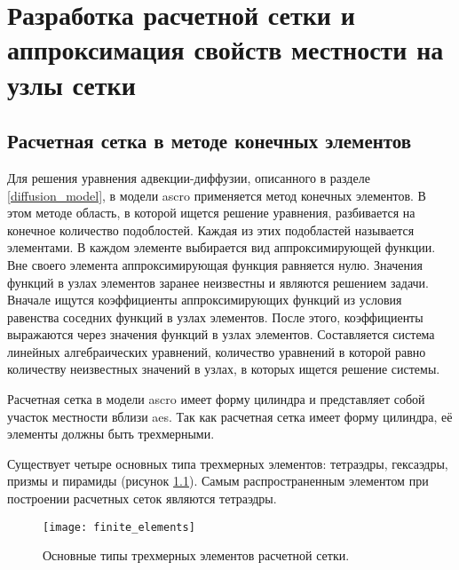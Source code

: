 \chapter{Разработка расчетной сетки и аппроксимация свойств местности на узлы сетки}


\section{Расчетная сетка в методе конечных элементов}
\label{sec_fin_elem_mesh}

Для решения уравнения адвекции-диффузии, описанного в разделе \ref{diffusion_model}, в модели \ac{ascro} применяется 
метод конечных элементов. В этом методе область, в которой ищется решение уравнения, разбивается на конечное количество 
подоблостей. Каждая из этих подобластей называется элементами. В каждом элементе выбирается вид аппроксимирующей функции. 
Вне своего элемента аппроксимирующая функция равняется нулю. Значения функций в узлах элементов заранее неизвестны и 
являются решением задачи. Вначале ищутся коэффициенты аппроксимирующих функций из условия равенства соседних функций в 
узлах элементов. После этого, коэффициенты выражаются через значения функций в узлах элементов. Составляется система 
линейных алгебраических уравнений, количество уравнений в которой равно количеству неизвестных значений в узлах, в 
которых ищется решение системы. 

Расчетная сетка в модели \ac{ascro} имеет форму цилиндра и представляет собой участок местности вблизи \ac{aes}. 
Так как расчетная сетка имеет форму цилиндра, её элементы должны быть трехмерными.

Существует четыре основных типа трехмерных элементов: тетраэдры, гексаэдры, призмы и пирамиды (рисунок 
\ref{fig_finite_elements}). Самым распространенным элементом при построении расчетных сеток являются тетраэдры. 

\begin{figure}[ht]
\centering
	\texttt{[image: finite\_elements]}
	\captionsetup{justification=centering}
    \caption{Основные типы трехмерных элементов расчетной сетки.}
    \label{fig_finite_elements}
\end{figure}

